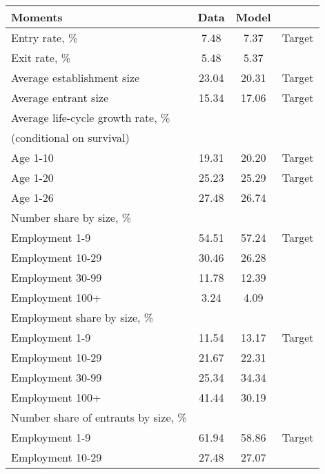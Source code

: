 \begin{tabular}{lccc}
\toprule
Moments & Data & Model &  \\
\midrule
Entry rate, \% & 7.48 & 7.37 & Target \\
Exit rate, \% & 5.48 & 5.37 &  \\
Average establishment size & 23.04 & 20.31 & Target \\
Average entrant size & 15.34 & 17.06 & Target \\
Average life-cycle growth rate, \% &   &   &  \\
(conditional on survival) &   &   &  \\
\hspace{10mm}Age 1-10 & 19.31 & 20.20 & Target \\
\hspace{10mm}Age 1-20 & 25.23 & 25.29 & Target \\
\hspace{10mm}Age 1-26 & 27.48 & 26.74 &  \\
Number share by size, \% &   &   &  \\
\hspace{10mm}Employment 1-9 & 54.51 & 57.24 & Target \\
\hspace{10mm}Employment 10-29 & 30.46 & 26.28 &  \\
\hspace{10mm}Employment 30-99 & 11.78 & 12.39 &  \\
\hspace{10mm}Employment 100+ & 3.24 & 4.09 &  \\
Employment share by size, \% &   &   &  \\
\hspace{10mm}Employment 1-9 & 11.54 & 13.17 & Target \\
\hspace{10mm}Employment 10-29 & 21.67 & 22.31 &  \\
\hspace{10mm}Employment 30-99 & 25.34 & 34.34 &  \\
\hspace{10mm}Employment 100+ & 41.44 & 30.19 &  \\
Number share of entrants by size, \% &   &   &  \\
\hspace{10mm}Employment 1-9 & 61.94 & 58.86 & Target \\
\hspace{10mm}Employment 10-29 & 27.48 & 27.07 &  \\

\end{tabular}
